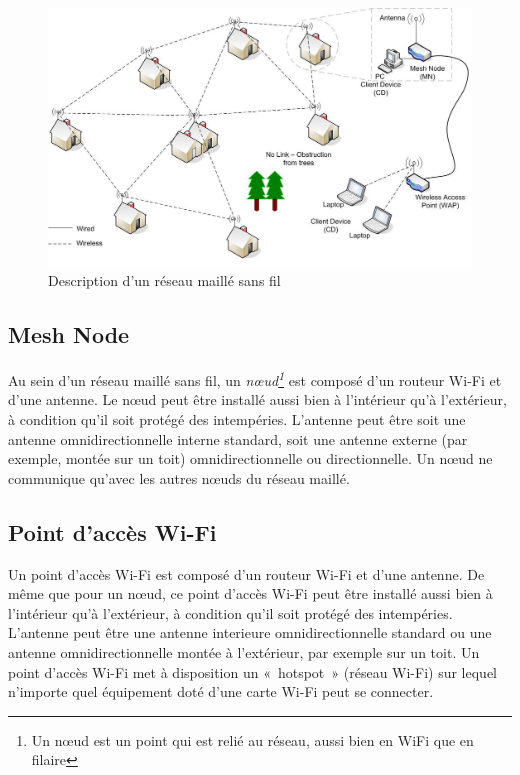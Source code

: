 \documentclass[a4paper,french,11pt,twoside]{article}
\begin{document}
\begin{figure}[!h]
\center
\includegraphics[scale=0.29]{figure1.jpeg}
\caption{Description d'un réseau maillé sans fil}
\label{figure1} %
\end{figure}

\subsection{Mesh Node}

Au sein d'un réseau maillé sans fil, un \emph{nœud\footnote{Un nœud est un point qui est relié au réseau, aussi bien en WiFi que en filaire}} est composé d'un routeur Wi-Fi et d'une antenne. Le nœud peut être installé aussi bien à l'intérieur qu'à l'extérieur, à condition qu'il soit protégé des intempéries. L'antenne peut être soit une antenne omnidirectionnelle interne standard, soit une antenne externe (par exemple, montée sur un toit) omnidirectionnelle ou directionnelle. Un nœud ne communique qu'avec les autres nœuds du réseau maillé.

\subsection{Point d'accès Wi-Fi}

Un point d'accès Wi-Fi est composé d'un routeur Wi-Fi et d'une antenne. De même que pour un nœud, ce point d'accès Wi-Fi peut être installé aussi bien à l'intérieur qu'à l'extérieur, à condition qu'il soit protégé des intempéries. L'antenne peut être une antenne interieure omnidirectionnelle standard ou une antenne omnidirectionnelle montée à l'extérieur, par exemple sur un toit. Un point d'accès Wi-Fi met à disposition un «~hotspot~» (réseau Wi-Fi) sur lequel n'importe quel équipement doté d'une carte Wi-Fi peut se connecter.
\end{document}

